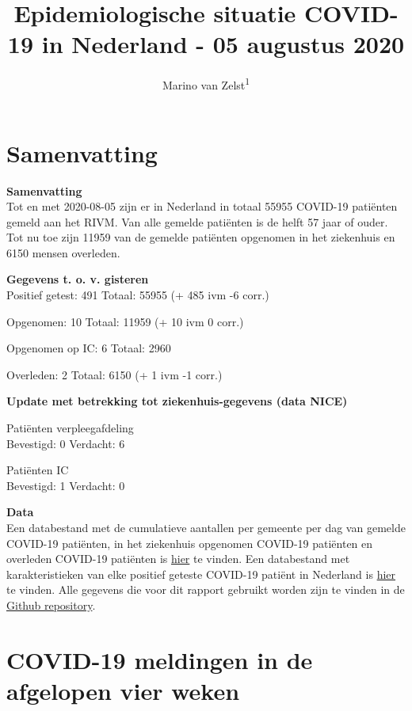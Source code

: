 \documentclass[
  english,
  man,floatsintext]{apa6}
\title{Epidemiologische situatie COVID-19 in Nederland - 05 augustus 2020}
\author{Marino van Zelst\textsuperscript{1}}
\date{}
\affiliation{\vspace{0.5cm}\textsuperscript{1} -}
\begin{document}
\maketitle

{
\hypersetup{linkcolor=}
\setcounter{tocdepth}{3}
\tableofcontents
}
\newpage

\hypertarget{samenvatting}{%
\section{Samenvatting}\label{samenvatting}}

\textbf{Samenvatting}\\
Tot en met 2020-08-05 zijn er in Nederland in totaal 55955 COVID-19 patiënten gemeld aan het RIVM. Van alle gemelde patiënten is de helft 57 jaar of ouder. Tot nu toe zijn 11959 van de gemelde patiënten opgenomen in het ziekenhuis en 6150 mensen overleden.

\textbf{Gegevens t. o. v. gisteren}\\
Positief getest: 491
Totaal: 55955 (+ 485 ivm -6 corr.)

Opgenomen: 10
Totaal: 11959 (+
10 ivm 0 corr.)

Opgenomen op IC: 6
Totaal: 2960

Overleden: 2
Totaal: 6150 (+
1 ivm -1 corr.)

\textbf{Update met betrekking tot ziekenhuis-gegevens (data NICE)}

Patiënten verpleegafdeling\\
Bevestigd: 0 Verdacht: 6

Patiënten IC\\
Bevestigd: 1 Verdacht: 0

\textbf{Data}\\
Een databestand met de cumulatieve aantallen per gemeente per dag van gemelde COVID-19 patiënten, in het ziekenhuis opgenomen COVID-19 patiënten en overleden COVID-19 patiënten is \href{https://data.rivm.nl/geonetwork/srv/dut/catalog.search\#/metadata/1c0fcd57-1102-4620-9cfa-441e93ea5604}{hier} te vinden. Een databestand met karakteristieken van elke positief geteste COVID-19 patiënt in Nederland is \href{https://data.rivm.nl/geonetwork/srv/dut/catalog.search\#/metadata/2c4357c8-76e4-4662-9574-1deb8a73f724?tab=relations}{hier} te vinden. Alle gegevens die voor dit rapport gebruikt worden zijn te vinden in de \href{https://github.com/mzelst/covid-19}{Github repository}.

\newpage

\hypertarget{covid-19-meldingen-in-de-afgelopen-vier-weken}{%
\section{COVID-19 meldingen in de afgelopen vier weken}\label{covid-19-meldingen-in-de-afgelopen-vier-weken}}
\end{document}
